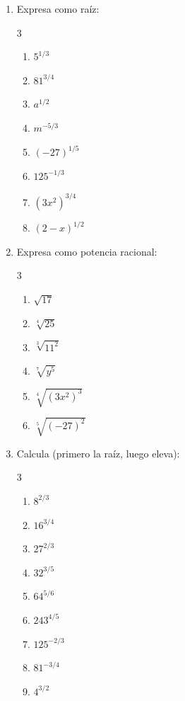 \documentclass[11pt, letterpaper]{article}
\begin{document}
\begin{enumerate}[label=\textbf{\arabic*.}, leftmargin=*]
  \item Expresa como raíz:
  \begin{multicols}{3}
  \begin{enumerate}[label=\alph*)]
    \item $5^{1/3}$
    \item $81^{3/4}$
    \item $a^{1/2}$
    \item $m^{-5/3}$
    \item $(-27)^{1/5}$
    \item $125^{-1/3}$
    \item $(3x^2)^{3/4}$
    \item $(2-x)^{1/2}$
  \end{enumerate}
  \end{multicols}

  \item Expresa como potencia racional:
  \begin{multicols}{3}
  \begin{enumerate}[label=\alph*)]
    \item $\sqrt{17}$
    \item $\sqrt[4]{25}$
    \item $\sqrt[3]{11^2}$
    \item $\sqrt[7]{y^5}$
    \item $\sqrt[4]{(3x^2)^3}$
    \item $\sqrt[5]{(-27)^2}$
  \end{enumerate}
  \end{multicols}

  \item Calcula (primero la raíz, luego eleva):
  \begin{multicols}{3}
  \begin{enumerate}[label=\alph*)]
    \item $8^{2/3}$
    \item $16^{3/4}$
    \item $27^{2/3}$
    \item $32^{3/5}$
    \item $64^{5/6}$
    \item $243^{4/5}$
    \item $125^{-2/3}$
    \item $81^{-3/4}$
    \item $4^{3/2}$
  \end{enumerate}
  \end{multicols}
\end{enumerate}
\end{document}
